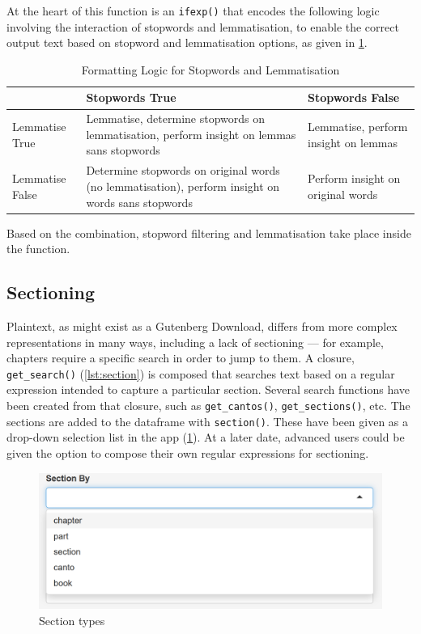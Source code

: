 \message{ !name(jason-cairns-dissertation.tex)}\documentclass[11pt, a4paper, titlepage]{report}
\begin{document}
At the heart of this function is an \texttt{ifexp()} that
encodes the following logic involving the interaction of stopwords and
lemmatisation, to enable the correct output text based on stopword and
lemmatisation options, as given in \cref{tab:formatting}.

\begin{table}[h]
  \centering
  \begin{tabular}{p{20mm}|p{50mm}p{50mm}}
  & Stopwords True & Stopwords False\\
  \toprule
Lemmatise True & Lemmatise, determine stopwords on lemmatisation, perform insight on lemmas sans stopwords & Lemmatise, perform insight on lemmas\\
Lemmatise False & Determine stopwords on original words (no lemmatisation), perform insight on words sans stopwords & Perform insight on original words\\
\end{tabular}
\caption{Formatting Logic for Stopwords and Lemmatisation}\label{tab:formatting}
\end{table}

Based on the combination, stopword filtering and lemmatisation take
place inside the function.

\subsection{Sectioning}

Plaintext, as might exist as a Gutenberg Download, differs from more
complex representations in many ways, including a lack of sectioning
--- for example, chapters require a specific search in order to jump
to them. A closure, \texttt{get_search()} (\cref{lst:section})
is composed that searches text based on a regular expression intended
to capture a particular section. Several search functions have been
created from that closure, such as \texttt{get_cantos()},
\texttt{get_sections()}, etc. The sections are added to the
dataframe with \texttt{section()}. These have been given as a
drop-down selection list in the app (\cref{fig:processing-section}).
At a later date, advanced users could be given the option to compose
their own regular expressions for sectioning.

\begin{figure}
\centering
\includegraphics[scale=0.7]{processing-section.png}
\caption{Section types\label{fig:processing-section}}
\end{figure}
\end{document}
